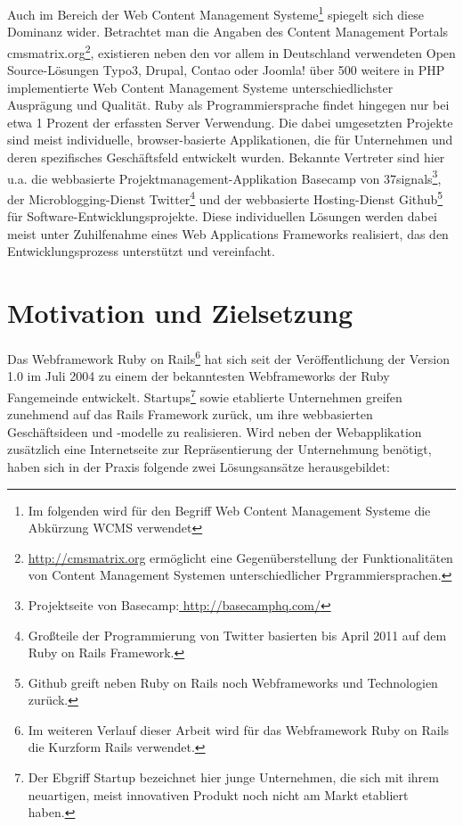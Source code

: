 Auch im Bereich der Web Content Management Systeme\footnote{Im folgenden wird für den Begriff Web Content Management Systeme die Abkürzung WCMS verwendet} spiegelt sich diese Dominanz wider. Betrachtet man die Angaben des Content Management Portals cmsmatrix.org\footnote{\href{http://cmsmatrix.org}{http://cmsmatrix.org} ermöglicht eine Gegenüberstellung der Funktionalitäten von Content Management Systemen unterschiedlicher Prgrammiersprachen.}, existieren neben den vor allem in Deutschland verwendeten Open Source-Lösungen Typo3, Drupal, Contao oder Joomla! über 500 weitere in PHP implementierte Web Content Management Systeme unterschiedlichster Ausprägung und Qualität.
Ruby als Programmiersprache findet hingegen nur bei etwa 1 Prozent der erfassten Server Verwendung. Die dabei umgesetzten Projekte sind meist individuelle, browser-basierte Applikationen, die für Unternehmen und deren spezifisches Geschäftsfeld entwickelt wurden. Bekannte Vertreter sind hier u.a. die webbasierte Projektmanagement-Applikation Basecamp von 37signals\footnote{Projektseite von Basecamp:\href{http://basecamphq.com}{ http://basecamphq.com/}}, der Microblogging-Dienst Twitter\footnote{
Großteile der Programmierung von Twitter basierten bis April 2011 auf dem Ruby on Rails Framework.} und der webbasierte Hosting-Dienst Github\footnote{Github greift neben Ruby on Rails noch  Webframeworks und Technologien zurück.
} für Software-Entwicklungsprojekte.
Diese individuellen Lösungen werden dabei meist unter Zuhilfenahme  eines Web Applications Frameworks realisiert, das den Entwicklungsprozess unterstützt und vereinfacht.



\section{Motivation und Zielsetzung}

Das Webframework Ruby on Rails\footnote{Im weiteren Verlauf dieser Arbeit wird für das Webframework Ruby on Rails die Kurzform Rails verwendet.} hat sich seit der Veröffentlichung der Version 1.0 im Juli 2004 zu einem der bekanntesten Webframeworks der Ruby Fangemeinde entwickelt.
Startups\footnote{Der Ebgriff Startup bezeichnet hier junge Unternehmen, die sich mit ihrem neuartigen, meist innovativen Produkt noch nicht am Markt etabliert haben.} sowie etablierte Unternehmen greifen zunehmend auf das Rails Framework zurück, um ihre webbasierten Geschäftsideen und -modelle zu realisieren.
Wird neben der Webapplikation zusätzlich eine Internetseite zur Repräsentierung der Unternehmung benötigt, haben sich in der Praxis folgende zwei Lösungsansätze herausgebildet:

